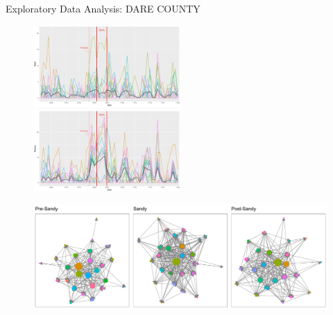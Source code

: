 \documentclass[10pt]{beamer}
\theoremstyle{definition}
\theoremstyle{remark}
\begin{document}
\begin{frame}{Exploratory Data Analysis: DARE COUNTY}
	\begin{minipage}{0.85\linewidth}
	 	 \begin{figure}
	 	 	\includegraphics[width=0.5\textwidth]{figures/Sendplot.pdf}	 	
	 	 	\includegraphics[width=0.5\textwidth]{figures/Receiveplot.pdf}
	 	 \end{figure}	
	 \begin{figure}
	 		 	\includegraphics[width=1\textwidth]{figures/Networkplot.pdf}
	 		 		 \end{figure}	
\end{minipage}
\begin{minipage}{0.13\linewidth}
		 \begin{figure}

\end{figure}
\end{minipage}
\end{frame}
\end{document}
